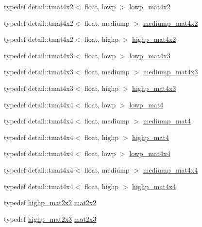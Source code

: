 \begin{CompactItemize}
\item 
typedef detail::tmat4x2$<$ float, lowp $>$ \hyperlink{group__core__precision_g2cfe24ae14da17f3510acfc3d03e05a5}{lowp\_\-mat4x2}
\item 
typedef detail::tmat4x2$<$ float, mediump $>$ \hyperlink{group__core__precision_g5ade2a6a65653683f76988c45da39f15}{mediump\_\-mat4x2}
\item 
typedef detail::tmat4x2$<$ float, highp $>$ \hyperlink{group__core__precision_gdf9c4a7947c2b0a79f52cc86a860f270}{highp\_\-mat4x2}
\item 
typedef detail::tmat4x3$<$ float, lowp $>$ \hyperlink{group__core__precision_gda92d0baf15002240dd6f638c57f9fec}{lowp\_\-mat4x3}
\item 
typedef detail::tmat4x3$<$ float, mediump $>$ \hyperlink{group__core__precision_g445d8aac3a5227af2d1e98d5c2f74d03}{mediump\_\-mat4x3}
\item 
typedef detail::tmat4x3$<$ float, highp $>$ \hyperlink{group__core__precision_gb8dfe989c5100c35ab5dec0e94f59d2a}{highp\_\-mat4x3}
\item 
typedef detail::tmat4x4$<$ float, lowp $>$ \hyperlink{group__core__precision_g8f6fef75ce51e9d6db7971478ad1f1c2}{lowp\_\-mat4}
\item 
typedef detail::tmat4x4$<$ float, mediump $>$ \hyperlink{group__core__precision_gf3de9a0400cf707d3c159f32902b92db}{mediump\_\-mat4}
\item 
typedef detail::tmat4x4$<$ float, highp $>$ \hyperlink{group__core__precision_g3067b3b8ce793227a51b2e3c233257d5}{highp\_\-mat4}
\item 
typedef detail::tmat4x4$<$ float, lowp $>$ \hyperlink{group__core__precision_gd31846a0565c22a0479950313c28b218}{lowp\_\-mat4x4}
\item 
typedef detail::tmat4x4$<$ float, mediump $>$ \hyperlink{group__core__precision_gcb51d2d10f7607617ac544f6db9a6eef}{mediump\_\-mat4x4}
\item 
typedef detail::tmat4x4$<$ float, highp $>$ \hyperlink{group__core__precision_g231950d260be295a25d7340e2020f55c}{highp\_\-mat4x4}
\item 
typedef \hyperlink{group__core__precision_g694146b8d430b22caa8b37571d9bc8bc}{highp\_\-mat2x2} \hyperlink{group__core__types_geddc14adb4963d9bad73866cc202fb40}{mat2x2}
\item 
typedef \hyperlink{group__core__precision_g7d4e5a1c803be5688c75241c924dfa58}{highp\_\-mat2x3} \hyperlink{group__core__types_gea02797b8231f6dd9380345f6ff12155}{mat2x3}
\item 

\end{CompactItemize}
